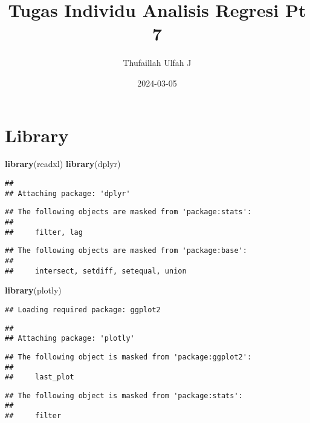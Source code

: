 \documentclass[
]{article}
\title{Tugas Individu Analisis Regresi Pt 7}
\author{Thufaillah Ulfah J}
\date{2024-03-05}
\newenvironment{Shaded}{\begin{snugshade}}{\end{snugshade}}
\newcommand{\FunctionTok}[1]{\textcolor[rgb]{0.13,0.29,0.53}{\textbf{#1}}}
\newcommand{\NormalTok}[1]{#1}
\begin{document}
\maketitle

\hypertarget{library}{%
\section{Library}\label{library}}

\begin{Shaded}
\begin{Highlighting}[]
\FunctionTok{library}\NormalTok{(readxl)}
\FunctionTok{library}\NormalTok{(dplyr)}
\end{Highlighting}
\end{Shaded}

\begin{verbatim}
## 
## Attaching package: 'dplyr'
\end{verbatim}

\begin{verbatim}
## The following objects are masked from 'package:stats':
## 
##     filter, lag
\end{verbatim}

\begin{verbatim}
## The following objects are masked from 'package:base':
## 
##     intersect, setdiff, setequal, union
\end{verbatim}

\begin{Shaded}
\begin{Highlighting}[]
\FunctionTok{library}\NormalTok{(plotly)}
\end{Highlighting}
\end{Shaded}

\begin{verbatim}
## Loading required package: ggplot2
\end{verbatim}

\begin{verbatim}
## 
## Attaching package: 'plotly'
\end{verbatim}

\begin{verbatim}
## The following object is masked from 'package:ggplot2':
## 
##     last_plot
\end{verbatim}

\begin{verbatim}
## The following object is masked from 'package:stats':
## 
##     filter
\end{verbatim}
\end{document}
